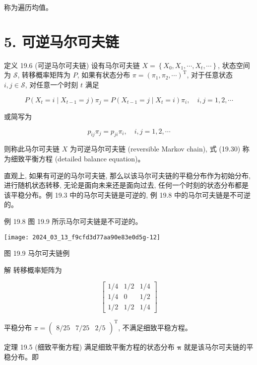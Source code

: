 \documentclass[10pt]{article}
\begin{document}
\begin{CJK*}{UTF8}{bsmi}
称为遍历均值。

\section*{5. 可逆马尔可夫链}
定义 19.6 (可逆马尔可夫链) 设有马尔可夫链 $X=\left\{X_{0}, X_{1}, \cdots, X_{t}, \cdots\right\}$, 状态空间为 $\mathcal{S}$, 转移概率矩阵为 $P$, 如果有状态分布 $\pi=\left(\pi_{1}, \pi_{2}, \cdots\right)^{\mathrm{T}}$, 对于任意状态 $i, j \in \mathcal{S}$, 对任意一个时刻 $t$ 满足


\begin{equation*}
P\left(X_{t}=i \mid X_{t-1}=j\right) \pi_{j}=P\left(X_{t-1}=j \mid X_{t}=i\right) \pi_{i}, \quad i, j=1,2, \cdots \tag{19.29}
\end{equation*}


或简写为


\begin{equation*}
p_{i j} \pi_{j}=p_{j i} \pi_{i}, \quad i, j=1,2, \cdots \tag{19.30}
\end{equation*}


则称此马尔可夫链 $X$ 为可逆马尔可夫链 (reversible Markov chain), 式 (19.30) 称为细致平衡方程 (detailed balance equation)。

直观上, 如果有可逆的马尔可夫链, 那么以该马尔可夫链的平稳分布作为初始分布, 进行随机状态转移, 无论是面向未来还是面向过去, 任何一个时刻的状态分布都是该平稳分布。例 19.3 中的马尔可夫链是可逆的, 例 19.8 中的马尔可夫链是不可逆的。

例 19.8 图 19.9 所示马尔可夫链是不可逆的。

\begin{center}
\texttt{[image: 2024\_03\_13\_f9cfd3d77aa90e83e0d5g-12]}
\end{center}

图 19.9 马尔可夫链例

解 转移概率矩阵为

$$
\left[\begin{array}{ccc}
1 / 4 & 1 / 2 & 1 / 4 \\
1 / 4 & 0 & 1 / 2 \\
1 / 2 & 1 / 2 & 1 / 4
\end{array}\right]
$$

平稳分布 $\pi=\left(\begin{array}{lll}8 / 25 & 7 / 25 & 2 / 5\end{array}\right)^{\mathrm{T}}$, 不满足细致平稳方程。

定理 19.5 (细致平衡方程) 满足细致平衡方程的状态分布 $\boldsymbol{\pi}$ 就是该马尔可夫链的平稳分布。即


\end{CJK*}
\end{document}
